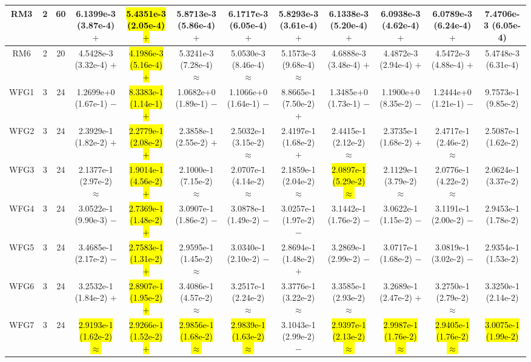 \documentclass[journal]{IEEEtran}
\begin{document}
\begin{table*}[htbp]
\begin{tabular}{cccccccccccc}
\hline
\multirow{1}{*}{RM3}&2&60&6.1399e-3 (3.87e-4) $+$&\hl{5.4351e-3 (2.05e-4) $+$}&5.8713e-3 (5.86e-4) $+$&6.1717e-3 (6.05e-4) $+$&5.8293e-3 (3.61e-4) $+$&6.1338e-3 (5.20e-4) $+$&6.0938e-3 (4.62e-4) $+$&6.0789e-3 (6.24e-4) $+$&7.4706e-3 (6.05e-4)\\
\hline
\multirow{1}{*}{RM6}&2&20&4.5428e-3 (3.32e-4) $+$&\hl{4.1986e-3 (5.16e-4) $+$}&5.3241e-3 (7.28e-4) $\approx$&5.0530e-3 (8.46e-4) $\approx$&5.1573e-3 (9.68e-4) $\approx$&4.6888e-3 (3.48e-4) $+$&4.4872e-3 (2.94e-4) $+$&4.5472e-3 (4.88e-4) $+$&5.4748e-3 (6.31e-4)\\
\hline
\multirow{1}{*}{WFG1}&3&24&1.2699e+0 (1.67e-1) $-$&\hl{8.3383e-1 (1.14e-1) $+$}&1.0682e+0 (1.89e-1) $-$&1.1066e+0 (1.64e-1) $-$&8.8665e-1 (7.50e-2) $+$&1.3485e+0 (1.73e-1) $-$&1.1900e+0 (8.35e-2) $-$&1.2444e+0 (1.21e-1) $-$&9.7573e-1 (9.85e-2)\\
\hline
\multirow{1}{*}{WFG2}&3&24&2.3929e-1 (1.82e-2) $+$&\hl{2.2779e-1 (2.08e-2) $+$}&2.3858e-1 (2.55e-2) $+$&2.5032e-1 (3.15e-2) $\approx$&2.4197e-1 (1.68e-2) $+$&2.4415e-1 (2.12e-2) $\approx$&2.3735e-1 (1.68e-2) $+$&2.4717e-1 (2.46e-2) $\approx$&2.5087e-1 (1.62e-2)\\
\hline
\multirow{1}{*}{WFG3}&3&24&2.1377e-1 (2.97e-2) $\approx$&\hl{1.9014e-1 (4.56e-2) $+$}&2.1000e-1 (7.15e-2) $\approx$&2.0707e-1 (4.14e-2) $\approx$&2.1859e-1 (2.04e-2) $\approx$&\hl{2.0897e-1 (5.29e-2) $\approx$}&2.1129e-1 (3.79e-2) $\approx$&2.0776e-1 (4.22e-2) $\approx$&2.0624e-1 (3.37e-2)\\
\hline
\multirow{1}{*}{WFG4}&3&24&3.0522e-1 (9.90e-3) $-$&\hl{2.7369e-1 (1.48e-2) $+$}&3.0907e-1 (1.86e-2) $-$&3.0878e-1 (1.49e-2) $-$&3.0257e-1 (1.97e-2) $-$&3.1442e-1 (1.76e-2) $-$&3.0622e-1 (1.15e-2) $-$&3.1191e-1 (2.00e-2) $-$&2.9453e-1 (1.78e-2)\\
\hline
\multirow{1}{*}{WFG5}&3&24&3.4685e-1 (2.17e-2) $-$&\hl{2.7583e-1 (1.31e-2) $+$}&2.9595e-1 (1.45e-2) $\approx$&3.0340e-1 (2.10e-2) $-$&2.8694e-1 (1.48e-2) $+$&3.2869e-1 (2.99e-2) $-$&3.0717e-1 (1.68e-2) $-$&3.0819e-1 (3.02e-2) $-$&2.9354e-1 (1.53e-2)\\
\hline
\multirow{1}{*}{WFG6}&3&24&3.2532e-1 (1.84e-2) $+$&\hl{2.8907e-1 (1.95e-2) $+$}&3.4086e-1 (4.57e-2) $\approx$&3.2517e-1 (2.24e-2) $\approx$&3.3776e-1 (3.22e-2) $\approx$&3.3585e-1 (2.93e-2) $\approx$&3.2689e-1 (2.47e-2) $+$&3.2750e-1 (2.79e-2) $\approx$&3.3250e-1 (2.14e-2)\\
\hline
\multirow{1}{*}{WFG7}&3&24&\hl{2.9193e-1 (1.62e-2) $\approx$}&\hl{2.9266e-1 (1.52e-2) $+$}&\hl{2.9856e-1 (1.68e-2) $\approx$}&\hl{2.9839e-1 (1.63e-2) $\approx$}&3.1043e-1 (2.99e-2) $-$&\hl{2.9397e-1 (2.13e-2) $\approx$}&\hl{2.9987e-1 (1.76e-2) $\approx$}&\hl{2.9405e-1 (1.76e-2) $\approx$}&\hl{3.0075e-1 (1.99e-2)}\\

\end{tabular}
\end{table*}
\end{document}
